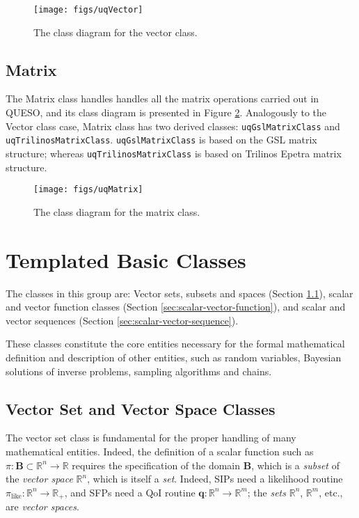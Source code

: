 \begin{figure}[!hpt]
\centering
\texttt{[image: figs/uqVector]}
\vspace*{-8pt}
\caption{ The class diagram for the vector class.}
\label{fig-vector-class}
\end{figure}



\subsection{Matrix}


The Matrix class handles handles all the matrix operations carried out in QUESO, and its class diagram is presented in Figure \ref{fig-matrix-class}. Analogously to the Vector class case,
Matrix class has two derived classes: \verb+uqGslMatrixClass+ and \verb+uqTrilinosMatrixClass+. \verb+uqGslMatrixClass+ is based on the GSL matrix structure; whereas \verb+uqTrilinosMatrixClass+ is based on Trilinos Epetra matrix structure.


\begin{figure}[!hp]
\centering
\texttt{[image: figs/uqMatrix]}
\vspace*{-8pt}
\caption{The class diagram for the matrix class.}
\label{fig-matrix-class}
\end{figure}


\section{Templated Basic Classes}
The classes in this group are: Vector sets, subsets and spaces (Section \ref{sec:vector-set-space}), scalar and vector function classes (Section \ref{sec:scalar-vector-function}), and scalar and vector sequences (Section \ref{sec:scalar-vector-sequence}).

These classes constitute the core entities necessary for the formal
mathematical definition and description of other entities, such as
random variables, Bayesian solutions of inverse problems, sampling algorithms and chains.



\subsection{Vector Set  and Vector Space Classes}\label{sec:vector-set-space}
%
The vector set class is fundamental for the proper handling of many mathematical entities.
Indeed, the definition of a scalar function such as $\pi:\mathbf{B}\subset\mathbb{R}^n\rightarrow\mathbb{R}$ requires the
specification of the domain $\mathbf{B}$, which is a {\it subset} of the {\it vector space} $\mathbb{R}^n$, which is itself a {\it set}. Indeed, 
 SIPs need a likelihood routine $\pi_{\text{like}}:\mathbb{R}^n\rightarrow\mathbb{R}_+$,
and SFPs need a QoI routine $\mathbf{q}:\mathbb{R}^n\rightarrow\mathbb{R}^m$; the \textit{sets} $\mathbb{R}^n$, $\mathbb{R}^m$, etc., are {\it vector spaces}.

